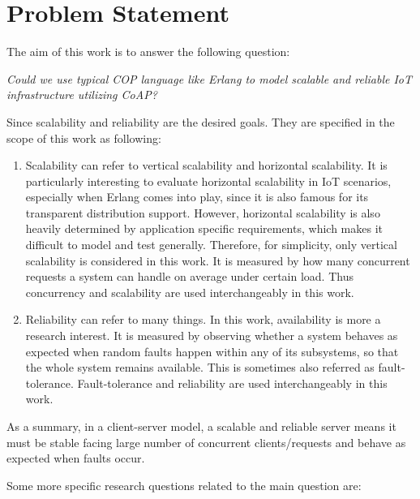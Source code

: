 \chapter{Problem Statement}\label{ch2}


The aim of this work is to answer the following question:

\textit{Could we use typical COP language like Erlang to model scalable and reliable IoT infrastructure utilizing CoAP?}

Since scalability and reliability are the desired goals. They are specified in the scope of this work as following:

\begin{enumerate}

\item Scalability can refer to vertical scalability and horizontal scalability. It is particularly interesting to evaluate horizontal scalability in IoT scenarios, especially when Erlang comes into play, since it is also famous for its transparent distribution support. However, horizontal scalability is also heavily determined by application specific requirements, which makes it difficult to model and test generally. Therefore, for simplicity, only vertical scalability is considered in this work. It is measured by how many concurrent requests a system can handle on average under certain load. Thus concurrency and scalability are used interchangeably in this work.

\item Reliability can refer to many things. In this work, availability is more a research interest. It is measured by observing whether a system behaves as expected when random faults happen within any of its subsystems, so that the whole system remains available. This is sometimes also referred as fault-tolerance. Fault-tolerance and reliability are used interchangeably in this work.

\end{enumerate}

As a summary, in a client-server model, a scalable and reliable server means it must be stable facing large number of concurrent clients/requests and behave as expected when faults occur.

Some more specific research questions related to the main question are:

